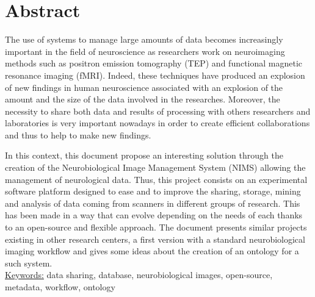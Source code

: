 \section*{Abstract}
\vspace{0.2cm}
\par
The use of systems to manage large amounts of data becomes increasingly important in the field of neuroscience as researchers work on neuroimaging methods such as positron emission tomography (TEP) and functional magnetic resonance imaging (fMRI). Indeed, these techniques have produced an explosion of new findings in human neuroscience associated with an explosion of the amount and the size of the data involved in the researches. Moreover, the necessity to share both data and results of processing with others researchers and laboratories is very important nowadays in order to create efficient collaborations and thus to help to make new findings.
\par
In this context, this document propose an interesting solution through the creation of the Neurobiological Image Management System (NIMS) allowing the management of neurological data. Thus, this project consists on an experimental software platform designed to ease and to improve the sharing, storage, mining and analysis of data coming from scanners in different groups of research. This has been made in a way that can evolve depending on the needs of each thanks to an open-source and flexible approach. The document presents similar projects existing in other research centers, a first version with a standard neurobiological imaging workflow and gives some ideas about the creation of an ontology for a such system.
\vspace{0.3cm}\\
\underline{Keywords:} data sharing, database, neurobiological images, open-source, metadata, workflow, ontology
\vspace{0.5cm}\\
